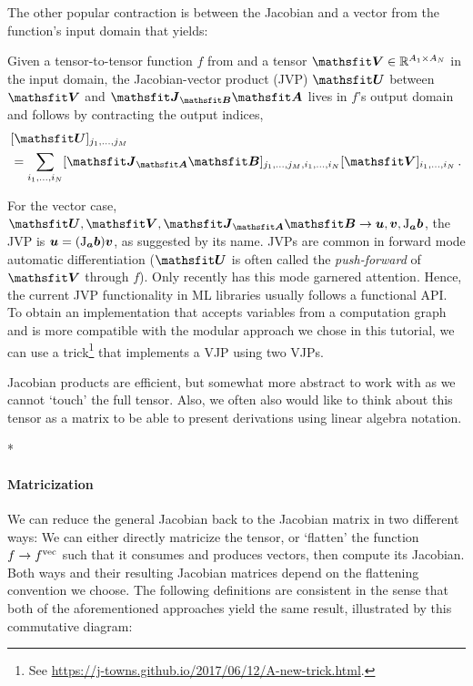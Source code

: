 The other popular contraction is between the Jacobian and a vector from the function's input domain that yields:

\begin{definition}\label{def:jvp}
  Given a tensor-to-tensor function $f$ from  and a tensor $\tV \in \sR^{A_1 \times A_N}$ in the input domain, the Jacobian-vector product (JVP) $\tU$ between $\tV$ and $\tJ_{\tB}\tA$ lives in $f$'s output domain and follows by contracting the output indices,
  \begin{align*}
    &[\tU]_{j_1, \dots, j_M}
    \\
    &=
      \sum_{i_1, \dots, i_N}
      [\tJ_{\tA}\tB]_{j_1, \dots, j_M, i_1, \dots, i_N}
      [\tV]_{i_1, \dots, i_N}\,.
  \end{align*}
\end{definition}
For the vector case, $\tU, \tV, \tJ_{\tA}\tB \to \vu, \vv, \jac_{\va}\vb$, the JVP is $\vu = (\jac_{\va}\vb) \vv$, as suggested by its name.
JVPs are common in forward mode automatic differentiation ($\tU$ is often called the \emph{push-forward} of $\tV$ through $f$).
Only recently has this mode garnered attention.
Hence, the current JVP functionality in ML libraries usually follows a functional API.
To obtain an implementation that accepts variables from a computation graph and is more compatible with the modular approach we chose in this tutorial, we can use a trick\footnote{See \url{https://j-towns.github.io/2017/06/12/A-new-trick.html}.} that implements a VJP using two VJPs.

Jacobian products are efficient, but somewhat more abstract to work with as we cannot `touch' the full tensor. Also, we often also would like to think about this tensor as a matrix to be able to present derivations using linear algebra notation.

\switchcolumn[1]*
\switchcolumn[0]

\paragraph{Matricization} We can reduce the general Jacobian back to the Jacobian matrix in two different ways: We can either directly matricize the tensor, or `flatten' the function $f \to f^{\vec}$ such that it consumes and produces vectors, then compute its Jacobian.
Both ways and their resulting Jacobian matrices depend on the flattening convention we choose.
The following definitions are consistent in the sense that both of the aforementioned approaches yield the same result, illustrated by this commutative diagram:


